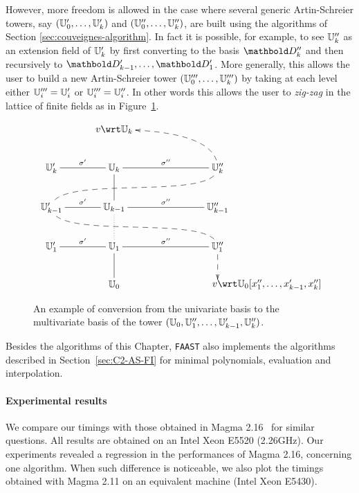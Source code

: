   However, more freedom is allowed in the case where
several generic Artin-Schreier towers, say $(\mathbb{U}_0',\ldots,\mathbb{U}_k')$ and
$(\mathbb{U}_0'',\ldots,\mathbb{U}_k'')$, are built using the algorithms of Section
\ref{sec:couveignes-algorithm}. In fact it is possible, for example,
to see $\mathbb{U}_k''$ as an extension field of $\mathbb{U}'_k$ by first converting
to the basis $\basis{D}''_k$ and then recursively to
$\basis{D}'_{k-1},\ldots,\basis{D}'_1$. More generally, this allows
the user to build a new Artin-Schreier tower
$(\mathbb{U}_0''',\ldots,\mathbb{U}_k''')$ by taking at each level either
$\mathbb{U}_i'''=\mathbb{U}_i'$ or $\mathbb{U}_i'''=\mathbb{U}_i''$.  In other words this allows the
user to \emph{zig-zag} in the lattice of finite fields as in
Figure~\ref{fig:lattice}.

\begin{figure}
  \centering
  \begin{equation*}
    \xymatrix@C=1cm{
      & v\wrt\U_k \ar@{<--}@(r,u)[dr] \\
      \U_k'\ar@{-}[r]^{\sigma'} & \U_k\ar@{-}[d] & \U_k''\ar@{-}[l]_{\sigma''} \ar@{--}@(d,u)[dll]\\
      \U_{k-1}'\ar@{-}[r]^{\sigma'} \ar@{--}@(d,u)[drr] & \U_{k-1}\ar@{.}[d] & \U_{k-1}''\ar@{-}[l]_{\sigma''}\\
      \U_1'\ar@{-}[r]^{\sigma'} & \U_1\ar@{-}[d] & \U_1''\ar@{-}[l]_{\sigma''}\ar@{-->}[d]\\
      & \U_0 & *[r]{v\wrt\U_0[x_1'',\ldots,x_{k-1}',x_k'']}
    }
  \end{equation*}
  \caption{An example of conversion from the univariate basis to the
    multivariate basis of the tower $(\mathbb{U}_0,\mathbb{U}_1'',\ldots,\mathbb{U}_{k-1}',\mathbb{U}_k'')$.}
  \label{fig:lattice}
\end{figure}

Besides the algorithms of this Chapter, \texttt{FAAST} also implements
the algorithms described in Section~\ref{sec:C2-AS-FI} for minimal
polynomials, evaluation and interpolation.

\paragraph{Experimental results} We compare our timings with those
obtained in Mag\-ma 2.16~\cite{MAGMA} for similar questions.  All
results are obtained on an Intel Xeon E5520 (2.26GHz). Our experiments
revealed a regression in the performances of Magma 2.16, concerning
one algorithm. When such difference is noticeable, we also plot the
timings obtained with Magma 2.11 on an equivalent machine (Intel Xeon
E5430).


